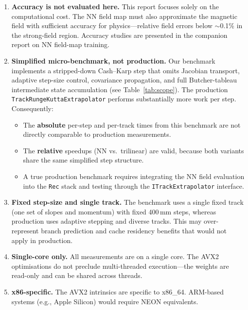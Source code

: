 \documentclass[11pt,a4paper]{article}
\begin{document}
\begin{enumerate}
    \item \textbf{Accuracy is not evaluated here.}  This report focuses
          solely on the computational cost.  The NN field map must also
          approximate the magnetic field with sufficient accuracy for
          physics---relative field errors below $\sim$0.1\% in the
          strong-field region.  Accuracy studies are presented in the
          companion report on NN field-map training.

    \item \textbf{Simplified micro-benchmark, not production.}  Our
          benchmark implements a stripped-down Cash--Karp step that
          omits Jacobian transport, adaptive step-size control,
          covariance propagation, and full Butcher-tableau intermediate
          state accumulation (see Table~\ref{tab:scope}).  The
          production \texttt{TrackRungeKuttaExtrapolator} performs
          substantially more work per step.  Consequently:
          \begin{itemize}
              \item The \textbf{absolute} per-step and per-track times
                    from this benchmark are not directly comparable to
                    production measurements.
              \item The \textbf{relative} speedups (NN vs.\ trilinear)
                    are valid, because both variants share the same
                    simplified step structure.
              \item A true production benchmark requires integrating the
                    NN field evaluation into the \texttt{Rec} stack and
                    testing through the \texttt{ITrackExtrapolator}
                    interface.
          \end{itemize}

    \item \textbf{Fixed step-size and single track.}  The benchmark
          uses a single fixed track (one set of slopes and momentum)
          with fixed 400\,mm steps, whereas production uses adaptive
          stepping and diverse tracks.  This may over-represent branch
          prediction and cache residency benefits that would not
          apply in production.

    \item \textbf{Single-core only.}  All measurements are on a single
          core.  The AVX2 optimisations do not preclude multi-threaded
          execution---the weights are read-only and can be shared
          across threads.

    \item \textbf{x86-specific.}  The AVX2 intrinsics are specific to
          x86\_64.  ARM-based systems (e.g., Apple Silicon) would
          require NEON equivalents.
\end{enumerate}
\end{document}
